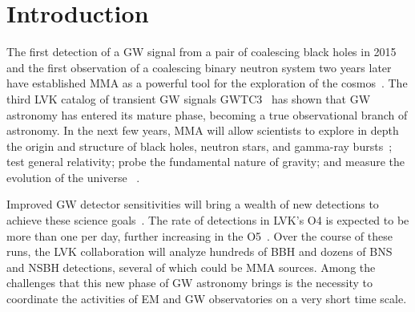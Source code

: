 \section{Introduction\label{intro}}

The first detection of a \ac{GW} signal from a pair of coalescing black holes in 2015 and the first observation of a coalescing binary neutron system two years later
have established \ac{MMA} as a powerful tool for the exploration of the cosmos~\cite{LIGOScientific:2016aoc,LIGOScientific:2017vwq}. The third \ac{LVK} catalog of transient \ac{GW} signals \ac{GWTC3}~\cite{LIGOScientific:2021djp}
has shown that \ac{GW} astronomy has entered its mature phase, becoming a true observational branch of astronomy. In the next few years, \ac{MMA} will allow scientists
to explore in depth the origin and structure of black holes, neutron stars, and gamma-ray bursts~\cite{Ciolfi:2018tal}; test general relativity; probe the fundamental nature of gravity; and
measure the evolution of the universe~\cite{LIGOScientific:2021sio,LIGOScientific:2021psn,LIGOScientific:2021aug} . 

Improved \ac{GW} detector sensitivities will bring a wealth of new detections to achieve these science goals~\cite{LIGOScientific:2014pky,VIRGO:2014yos}. The rate
of detections in \ac{LVK}'s \ac{O4} is expected to be more than one per day, further increasing in the \ac{O5}~\cite{KAGRA:2013rdx}. Over the course of
these runs, the \ac{LVK} collaboration will analyze hundreds of \ac{BBH} and dozens of \ac{BNS} and \ac{NSBH} detections, several of which could be \ac{MMA} sources. Among the
challenges that this new phase of \ac{GW} astronomy brings is the necessity to coordinate the activities of \ac{EM} and \ac{GW} observatories on a very short time
scale. 

